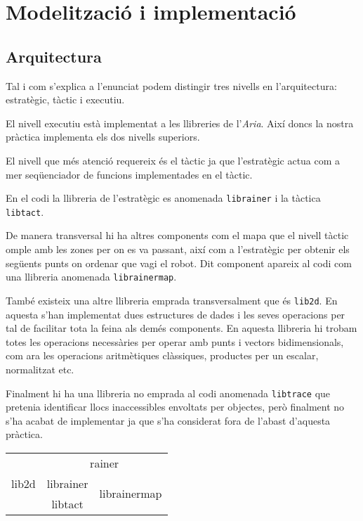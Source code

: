 \section{Modelització i implementació}

\subsection{Arquitectura}
Tal i com s'explica a l'enunciat podem distingir tres nivells en l'arquitectura: estratègic, tàctic i executiu.

El nivell executiu està implementat a les llibreries de l'\emph{Aria}. Així
doncs la nostra pràctica implementa els dos nivells superiors.

El nivell que més atenció requereix és el tàctic ja que l'estratègic actua com a mer seqüenciador
de funcions implementades en el tàctic.

En el codi la llibreria de l'estratègic es anomenada \texttt{librainer} i la tàctica \texttt{libtact}.

De manera transversal hi ha altres components com el mapa que el nivell tàctic omple amb les zones
per on es va passant, així com a l'estratègic per obtenir els següents punts on
ordenar que vagi el robot. Dit component apareix al codi com una llibreria
anomenada \texttt{librainermap}.

També existeix una altre llibreria emprada transversalment que és
\texttt{lib2d}. En aquesta s'han implementat dues estructures de dades i les
seves operacions per tal de facilitar tota la feina als demés components.
En aquesta llibreria hi trobam totes les operacions necessàries per operar amb
punts i vectors bidimensionals, com ara les operacions aritmètiques clàssiques,
productes per un escalar, normalitzat etc.

Finalment hi ha una llibreria no emprada al codi anomenada \texttt{libtrace} que
pretenia identificar llocs inaccessibles envoltats per objectes, però finalment
no s'ha acabat de implementar ja que s'ha considerat fora de l'abast d'aquesta
pràctica.


\begin{center}
  \begin{tabular}{|c|c|c|}
    \hline
    \multirow{3}{*}{lib2d} & \multicolumn{2}{|c|}{rainer}  \\
    \cline{2-3}\cline{3-3}
			  & librainer & \multirow{2}{*}{librainermap}\\
    \cline{2-2}
			  & libtact & \\
    \hline
  \end{tabular}
\end{center}


